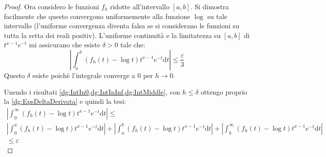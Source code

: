 \begin{proof}
	Ora considero le funzioni $f_h$ ridotte all'intervallo $[a,b]$.
	Si dimostra facilmente che questo convergono uniformemente alla funzione $\log$ su tale intervallo (l'uniforme convergenza
	diventa falsa se si considerano le funzioni su tutta la retta dei reali positiv).
	L'uniforme continuità e la limitatezza su $[a,b]$ di $t^{x-1}e^{-t}$ mi assicurano che esiste $\delta>0$ tale che:
	\begin{equation}\label{dg:IntMiddle}
		\left\lvert \int_a^b \left(f_h(t)-\log{t}\right)t^{x-1}e^{-t}\mathrm{d}t\right\rvert \le \frac{\varepsilon}3
	\end{equation}
	Questo $\delta$ esiste poichè l'integrale converge a 0 per $h\to 0$.
	
	Unendo i risultati \cref{dg:IntIn0,dg:IntInInf,dg:IntMiddle}, con $h\le\delta$ ottengo
	proprio la \cref{dg:EpsDeltaDerivata} e quindi la tesi:
	\begin{multline}
		\left\lvert
		\int_0^{\infty} \left(f_h(t)-\log{t}\right)t^{x-1}e^{-t}\mathrm{d}t
		\right\rvert \le \\
		\left\lvert \int_0^a \left(f_h(t)-\log{t}\right)t^{x-1}e^{-t}\mathrm{d}t\right\rvert +
		\left\lvert \int_a^b \left(f_h(t)-\log{t}\right)t^{x-1}e^{-t}\mathrm{d}t\right\rvert +
		\left\lvert \int_b^{\infty} \left(f_h(t)-\log{t}\right)t^{x-1}e^{-t}\mathrm{d}t\right\rvert \\
		\le \varepsilon
	\end{multline}
\end{proof}


